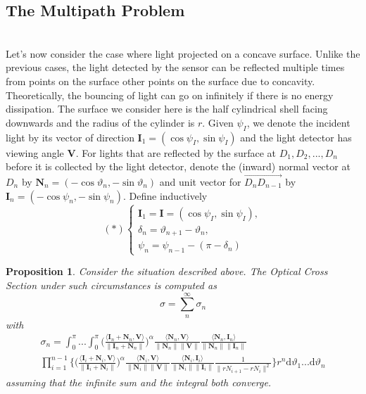 \documentclass[11pt]{amsart}
\newtheorem{proposition}{Proposition}
\newcommand{\ip}[2]{\langle {#1}, {#2} \rangle}
\theoremstyle{definition}
\begin{document}
\subsection{The Multipath Problem}~\\
Let's now consider the case where light projected on a concave surface. Unlike the previous cases, the light detected by the sensor can be reflected multiple times from points on the surface other points on the surface due to concavity. Theoretically, the bouncing of light can go on infinitely if there is no energy dissipation. The surface we consider here is the half cylindrical shell facing downwards and the radius of the cylinder is $r$. Given $\psi_I$, we denote the incident light by its vector of direction $\mathbf{I}_1=(\cos\psi_I,\sin\psi_I)$ and the light detector has viewing angle $\mathbf{V}$. For lights that are reflected by the surface at $D_1,D_2,...,D_n$ before it is collected by the light detector, denote the (inward) normal vector at $D_n$ by $\mathbf{N}_n=(-\cos\vartheta_n,-\sin\vartheta_n)$ and unit vector for $\overrightarrow{D_{n}D_{n-1}}$ by $\mathbf{I}_n=(-\cos\psi_n,-\sin\psi_n)$.  Define inductively 
$$(*)\begin{cases}\mathbf{I}_1=\mathbf{I}=(\cos\psi_{I},\sin\psi_{I}),\\ \delta_n=\vartheta_{n+1}-\vartheta_n,\\ \psi_n=\psi_{n-1}-(\pi-\delta_n)\end{cases}$$ 

\begin{proposition}
Consider the situation described above. The Optical Cross Section under such circumstances is computed as
$$\sigma=\sum_{n}^{\infty}\sigma_n$$
with
\begin{multline*}
\sigma_n =\int_{0}^{\pi}...\int_{0}^{\pi}\Bigg(\frac{\ip{\mathbf{I}_n+\mathbf{N}_n}{\mathbf{V}}}{\|\mathbf{I}_n+\mathbf{N}_n\|}\Bigg)^\alpha\frac{\ip{\mathbf{N}_n}{\mathbf{V}}}{\|\mathbf{N}_n\| \|\mathbf{V}\|}\frac{\ip{\mathbf{N}_n}{\mathbf{I}_n}}{\|\mathbf{N}_n\| \|\mathbf{I}_n\|} \\\prod_{i=1}^{n-1}\bigg\{ \Bigg(\frac{\ip{\mathbf{I}_i+\mathbf{N}_i}{\mathbf{V}}}{\|\mathbf{I}_i+\mathbf{N}_i\|}\Bigg)^\alpha \frac{\ip{\mathbf{N}_i}{\mathbf{V}}}{\|\mathbf{N}_i\| \|\mathbf{V}\|}\frac{\ip{\mathbf{N}_i}{\mathbf{I}_i}}{\|\mathbf{N}_i\| \|\mathbf{I}_i\|}\frac{1}{\|rN_{i+1}-rN_i\|^2}\bigg\}r^n\mathrm{d}\vartheta_1...\mathrm{d}\vartheta_n\end{multline*}
assuming that the infinite sum and the integral both converge.
\end{proposition}
\end{document}
